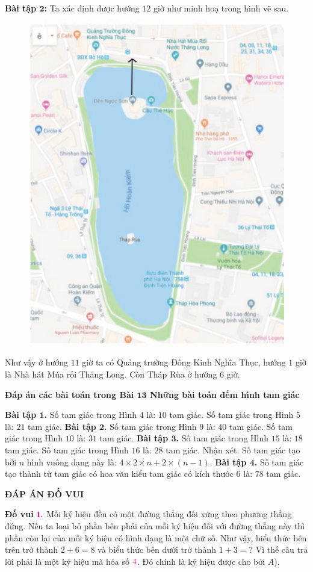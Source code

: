 \textbf{\color{toancuabi}Bài tập $\pmb2$:} Ta xác định được hướng $12$ giờ như minh hoạ trong hình vẽ sau.
 \begin{figure}[H]
	\centering
	\vspace*{-5pt}
	\captionsetup{labelformat= empty, justification=centering}
	\includegraphics[width=0.45\linewidth]{bando}
	\vspace*{-5pt}
\end{figure}
 Như vậy ở hướng $11$ giờ ta có Quảng trường Đông Kinh Nghĩa Thục, hướng $1$ giờ là Nhà hát Múa rối Thăng Long. Còn Tháp Rùa ở hướng $6$ giờ.
\begin{center}
	\textbf{\color{toancuabi}Đáp án các bài toán trong Bài $\pmb{13}$ Những bài toán đếm hình tam giác}
\end{center}
\textbf{\color{toancuabi}Bài tập $\pmb1$.}
\vskip 0.1cm
Số tam giác trong Hình $4$ là: $10$ tam giác.
\vskip 0.1cm
Số tam giác trong Hình $5$ là: $21$ tam giác.
\vskip 0.1cm
\textbf{\color{toancuabi}Bài tập $\pmb2$.}
\vskip 0.1cm
Số tam giác trong Hình $9$ là: $40$ tam giác.
\vskip 0.1cm
Số tam giác trong Hình $10$ là: $31$ tam giác.
\vskip 0.1cm
\textbf{\color{toancuabi}Bài tập $\pmb3$.}
\vskip 0.1cm
Số tam giác trong Hình $15$ là: $18$ tam giác.
\vskip 0.1cm
Số tam giác trong Hình $16$ là: $28$ tam giác.
\vskip 0.1cm
Nhận xét. Số tam giác tạo bởi $n$ hình vuông dạng này là: $4\times 2\times n + 2\times (n-1)$.
\vskip 0.1cm
\textbf{\color{toancuabi}Bài tập $\pmb4$.}
\vskip 0.1cm
Số tam giác tạo thành từ tam giác có hoa văn kiểu tam giác có kích thước $6$ là: $78$ tam giác.

\newpage
\begin{center}
	\textbf{\color{toancuabi}ĐÁP ÁN ĐỐ VUI}
\end{center}

\textbf{\color{toancuabi}Đố vui} $\color{toancuabi}\pmb{1.}$
Mỗi ký hiệu đều có một đường thẳng đối xứng theo phương thẳng đứng. Nếu ta loại bỏ phần bên phải của mỗi ký hiệu đối với đường thẳng này thì phần còn lại của mỗi ký hiệu có hình dạng là một chữ số. Như vậy, biểu thức bên trên trở thành $2+6=8$ và biểu thức bên dưới trở thành $1+3=?$ Vì thế câu trả lời phải là một ký hiệu mã hóa số $\color{toancuabi}4$. Đó chính là ký hiệu được cho bởi $A$).
\vskip 0.1cm

